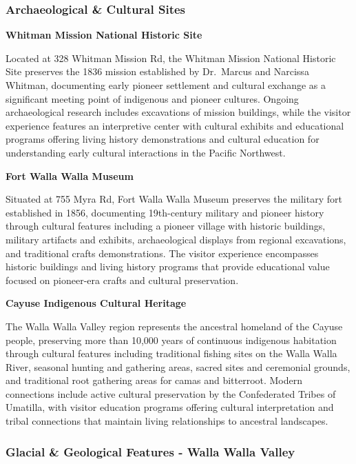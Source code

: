 \documentclass[
  11pt,
  letterpaper,
  DIV=10,
  numbers=noendperiod]{scrartcl}
\begin{document}
\subsubsection{Archaeological \& Cultural
Sites}\label{archaeological-cultural-sites-3}

\textbf{Whitman Mission National Historic Site}

Located at 328 Whitman Mission Rd, the Whitman Mission National Historic
Site preserves the 1836 mission established by Dr.~Marcus and Narcissa
Whitman, documenting early pioneer settlement and cultural exchange as a
significant meeting point of indigenous and pioneer cultures. Ongoing
archaeological research includes excavations of mission buildings, while
the visitor experience features an interpretive center with cultural
exhibits and educational programs offering living history demonstrations
and cultural education for understanding early cultural interactions in
the Pacific Northwest.

\textbf{Fort Walla Walla Museum}

Situated at 755 Myra Rd, Fort Walla Walla Museum preserves the military
fort established in 1856, documenting 19th-century military and pioneer
history through cultural features including a pioneer village with
historic buildings, military artifacts and exhibits, archaeological
displays from regional excavations, and traditional crafts
demonstrations. The visitor experience encompasses historic buildings
and living history programs that provide educational value focused on
pioneer-era crafts and cultural preservation.

\textbf{Cayuse Indigenous Cultural Heritage}

The Walla Walla Valley region represents the ancestral homeland of the
Cayuse people, preserving more than 10,000 years of continuous
indigenous habitation through cultural features including traditional
fishing sites on the Walla Walla River, seasonal hunting and gathering
areas, sacred sites and ceremonial grounds, and traditional root
gathering areas for camas and bitterroot. Modern connections include
active cultural preservation by the Confederated Tribes of Umatilla,
with visitor education programs offering cultural interpretation and
tribal connections that maintain living relationships to ancestral
landscapes.

\subsubsection{Glacial \& Geological Features - Walla Walla
Valley}\label{glacial-geological-features---walla-walla-valley}
\end{document}

